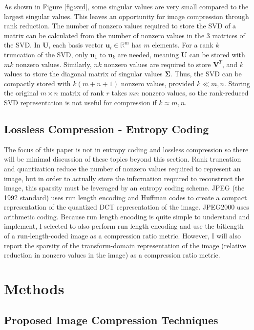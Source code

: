 \documentclass[conference]{IEEEtran}
\begin{document}
As shown in Figure \ref{fig:svd}, some singular values are very small compared to the largest singular values.
This leaves an opportunity for image compression through rank reduction.
The number of nonzero values required to store the SVD of a matrix can be calculated from the number of nonzero values in the 3 matrices of the SVD.
In $\mathbf{U}$, each basis vector $\mathbf{u}_i \in \mathbb{R}^m$ has $m$ elements.
For a rank $k$ truncation of the SVD, only $\mathbf{u}_1$ to $\mathbf{u}_k$ are needed, meaning $\mathbf{U}$ can be stored with $mk$ nonzero values.
Similarly, $nk$ nonzero values are required to store $\mathbf{V}^T$, and $k$ values to store the diagonal matrix of singular values $\bm{\Sigma}$.
Thus, the SVD can be compactly stored with $k(m + n + 1)$ nonzero values, provided $k \ll m,n$.
Storing the original $m\times n$ matrix of rank $r$ takes $mn$ nonzero values, so the rank-reduced SVD representation is not useful for compression if $k \approx m,n$.

\subsection{Lossless Compression - Entropy Coding}

The focus of this paper is not in entropy coding and lossless compression so there will be minimal discussion of these topics beyond this section.
Rank truncation and quantization reduce the number of nonzero values required to represent an image, but in order to actually store the information required to reconstruct the image, this sparsity must be leveraged by an entropy coding scheme.
JPEG (the 1992 standard) uses run length encoding and Huffman codes to create a compact representation of the quantized DCT representation of the image.
JPEG2000 uses arithmetic coding.
Because run length encoding is quite simple to understand and implement, I selected to also perform run length encoding and use the bitlength of a run-length-coded image as a compression ratio metric.
However, I will also report the sparsity of the transform-domain representation of the image (relative reduction in nonzero values in the image) as a compression ratio metric.

\section{Methods}

\subsection{Proposed Image Compression Techniques}
\end{document}
